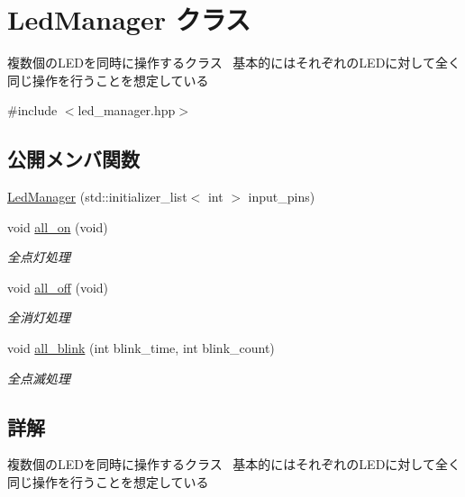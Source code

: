 \hypertarget{class_led_manager}{}\section{Led\+Manager クラス}
\label{class_led_manager}


複数個の\+L\+E\+Dを同時に操作するクラス~\newline
基本的にはそれぞれの\+L\+E\+Dに対して全く同じ操作を行うことを想定している  




{\ttfamily \#include $<$led\+\_\+manager.\+hpp$>$}

\subsection*{公開メンバ関数}
\begin{DoxyCompactItemize}
\item 
\mbox{\hyperlink{class_led_manager_a236ac36410fc821fea9c33a73645b64e}{Led\+Manager}} (std\+::initializer\+\_\+list$<$ int $>$ input\+\_\+pins)
\item 
void \mbox{\hyperlink{class_led_manager_a28303e2b12fbac168e9026a128977081}{all\+\_\+on}} (void)
\begin{DoxyCompactList}\small\item\em 全点灯処理 \end{DoxyCompactList}\item 
void \mbox{\hyperlink{class_led_manager_a1ae688f33cdbbcce355a56191fcc9713}{all\+\_\+off}} (void)
\begin{DoxyCompactList}\small\item\em 全消灯処理 \end{DoxyCompactList}\item 
void \mbox{\hyperlink{class_led_manager_aa29681640377c0eb701941daf4782663}{all\+\_\+blink}} (int blink\+\_\+time, int blink\+\_\+count)
\begin{DoxyCompactList}\small\item\em 全点滅処理 \end{DoxyCompactList}\end{DoxyCompactItemize}


\subsection{詳解}
複数個の\+L\+E\+Dを同時に操作するクラス~\newline
基本的にはそれぞれの\+L\+E\+Dに対して全く同じ操作を行うことを想定している 

